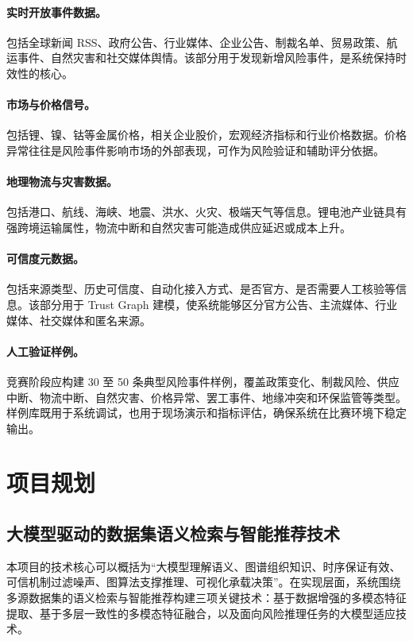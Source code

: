 ﻿\documentclass[12pt,a4paper]{article}
\begin{document}
\paragraph{实时开放事件数据。}包括全球新闻 RSS、政府公告、行业媒体、企业公告、制裁名单、贸易政策、航运事件、自然灾害和社交媒体舆情。该部分用于发现新增风险事件，是系统保持时效性的核心。

\paragraph{市场与价格信号。}包括锂、镍、钴等金属价格，相关企业股价，宏观经济指标和行业价格数据。价格异常往往是风险事件影响市场的外部表现，可作为风险验证和辅助评分依据。

\paragraph{地理物流与灾害数据。}包括港口、航线、海峡、地震、洪水、火灾、极端天气等信息。锂电池产业链具有强跨境运输属性，物流中断和自然灾害可能造成供应延迟或成本上升。

\paragraph{可信度元数据。}包括来源类型、历史可信度、自动化接入方式、是否官方、是否需要人工核验等信息。该部分用于 Trust Graph 建模，使系统能够区分官方公告、主流媒体、行业媒体、社交媒体和匿名来源。

\paragraph{人工验证样例。}竞赛阶段应构建 30 至 50 条典型风险事件样例，覆盖政策变化、制裁风险、供应中断、物流中断、自然灾害、价格异常、罢工事件、地缘冲突和环保监管等类型。样例库既用于系统调试，也用于现场演示和指标评估，确保系统在比赛环境下稳定输出。

\section{项目规划}
\subsection{大模型驱动的数据集语义检索与智能推荐技术}

本项目的技术核心可以概括为“大模型理解语义、图谱组织知识、时序保证有效、可信机制过滤噪声、图算法支撑推理、可视化承载决策”。在实现层面，系统围绕多源数据集的语义检索与智能推荐构建三项关键技术：基于数据增强的多模态特征提取、基于多层一致性的多模态特征融合，以及面向风险推理任务的大模型适应技术。
\end{document}
